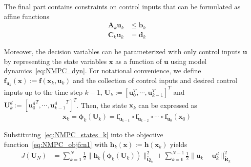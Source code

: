 The final part contains constraints on control inputs that can be formulated as affine functions
\begin{align}
\label{eq:NMPC_constraint1}
\mathbf{A}_{k}\mathbf{u}_{k} &\leq \mathbf{b}_{k} \\
\label{eq:NMPC_constraint2}
\mathbf{C}_{k}\mathbf{u}_{k} &= \mathbf{d}_{k}
\end{align}

Moreover, the decision variables can be parameterized with only control inputs $\mathbf{u}$ by representing the state variables $\mathbf{x}$ as a function of $\mathbf{u}$ using model dynamics~\eqref{eq:NMPC_dyn}.
For notational convenience, we define ${\mathbf{f}}_{\mathbf{u}_k}(\mathbf{x}):=\mathbf{f}(\mathbf{x}_k,\mathbf{u}_k)$ and the collection of control inputs and desired control inputs up to the time step $k-1$, $\mathbf{U}_k:=[\mathbf{u}_{0}^T,\cdots,\mathbf{u}_{k-1}^T]^T$ and $\mathbf{U}^d_k:=[{\mathbf{u}^d_{0}}^T,\cdots,{\mathbf{u}^d_{k-1}}^T]^T$. Then, the state $\mathbf{x}_k$ can be expressed as
\begin{align} \label{eq:NMPC_states_k}
\mathbf{x}_k = \boldsymbol{\phi}_k(\mathbf{U}_{k})=\mathbf{f}_{\mathbf{u}_{k-1}}\circ \mathbf{f}_{\mathbf{u}_{k-2}}\circ \cdots \circ \mathbf{f}_{\mathbf{u}_{0}}(\mathbf{x}_0)
\end{align}

Substituting~\eqref{eq:NMPC_states_k} into the objective function~\eqref{eq:NMPC_objfcn1} with $\mathbf{h}_{k}(\mathbf{x}):=\mathbf{h}(\mathbf{x}_{k})$ yields
\begin{align} \label{eq:NMPC_objfcn2}
J(\mathbf{U}_N) &= \sum_{k=1}^{N}\frac{1}{2}\|\mathbf{h}_{k}(\boldsymbol{\phi}_k(\mathbf{U}_{k}))\|^2_{\mathbf{\widetilde{Q}}_k} + \sum_{k=0}^{N-1}\frac{1}{2}\|\mathbf{u}_{k}-\mathbf{u}^{d}_{k}\|^2_{\mathbf{\widetilde{R}}_k}
\end{align}

